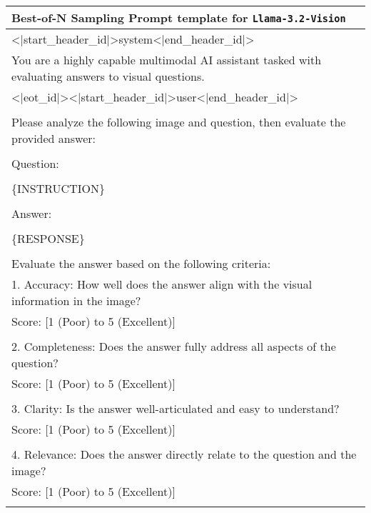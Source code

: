 \begin{table*}[hbtp]
    \begin{center}
        \begin{tabular}{|p{\textwidth}|}
            \hline
            \textbf{Best-of-N Sampling Prompt template for \texttt{Llama-3.2-Vision}} \\
            \hline
            \textless$\vert$start\_header\_id$\vert$\textgreater system\textless$\vert$end\_header\_id$\vert$\textgreater \\
            You are a highly capable multimodal AI assistant tasked with evaluating answers to visual questions. \\
            \textless$\vert$eot\_id$\vert$\textgreater \textless$\vert$start\_header\_id$\vert$\textgreater user\textless$\vert$end\_header\_id$\vert$\textgreater \\ \\
            Please analyze the following image and question, then evaluate the provided answer: \\ \\
            Question: \\ \\
            \{INSTRUCTION\} \\ \\
            Answer: \\ \\
            \{RESPONSE\} \\ \\
            Evaluate the answer based on the following criteria: \\
            1. Accuracy: How well does the answer align with the visual information in the image? \\
            Score: [1 (Poor) to 5 (Excellent)] \\ \\
            2. Completeness: Does the answer fully address all aspects of the question? \\
            Score: [1 (Poor) to 5 (Excellent)] \\ \\
            3. Clarity: Is the answer well-articulated and easy to understand? \\
            Score: [1 (Poor) to 5 (Excellent)] \\ \\
            4. Relevance: Does the answer directly relate to the question and the image? \\
            Score: [1 (Poor) to 5 (Excellent)] \\ \\

\end{tabular}
\end{center}
\end{table*}

